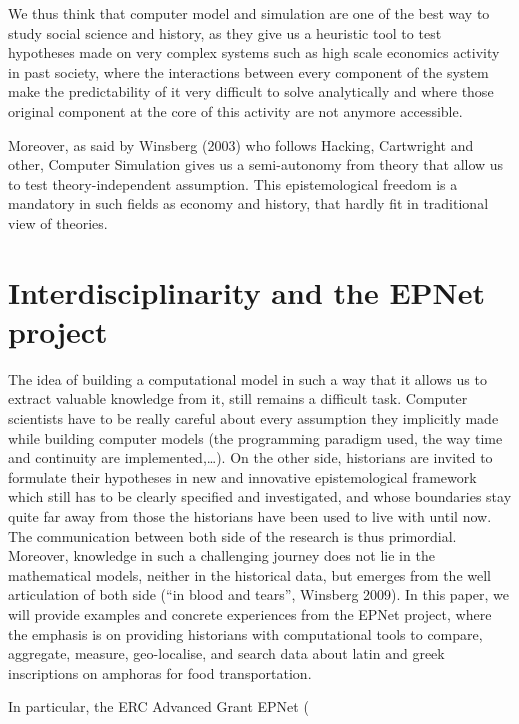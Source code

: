 \documentclass[a4paper]{article}
\begin{document}
We thus think that computer model and simulation are one of the best way to study social science and history, as they give  us a heuristic tool to test hypotheses made on very complex systems such as high scale economics activity in past society, where the interactions between every component of the system make the predictability of it very difficult to solve analytically and where those original component at the core of this activity are not anymore accessible.

Moreover, as said by Winsberg (2003) who follows Hacking, Cartwright and other, Computer Simulation gives us a semi-autonomy from theory that allow us to test theory-independent assumption. This epistemological freedom is a mandatory in such fields as economy and history, that hardly fit in traditional view of theories.


\section{Interdisciplinarity and the EPNet project}
The idea of building a computational model in such a way that it allows us to extract valuable knowledge from it, still remains a difficult task. Computer scientists have to be really careful about every assumption they implicitly made while building computer models (the programming paradigm used, the way time and continuity are implemented,\ldots). On the other side, historians are invited to formulate their hypotheses in new and innovative epistemological framework which still has to be clearly specified and investigated, and whose boundaries stay quite far away from those the historians have been used to live with until now. The communication between both side of the research is thus primordial. Moreover, knowledge in such a challenging journey does not lie in the mathematical models, neither in the historical data, but emerges from the well articulation of both side (``in blood and tears'', Winsberg 2009).
In this paper, we will provide examples and concrete experiences from the EPNet project, where the emphasis is on providing historians with computational tools to compare, aggregate, measure, geo-localise, and search data about latin and greek inscriptions on amphoras for food transportation.

In particular, the ERC Advanced Grant EPNet (
\end{document}
